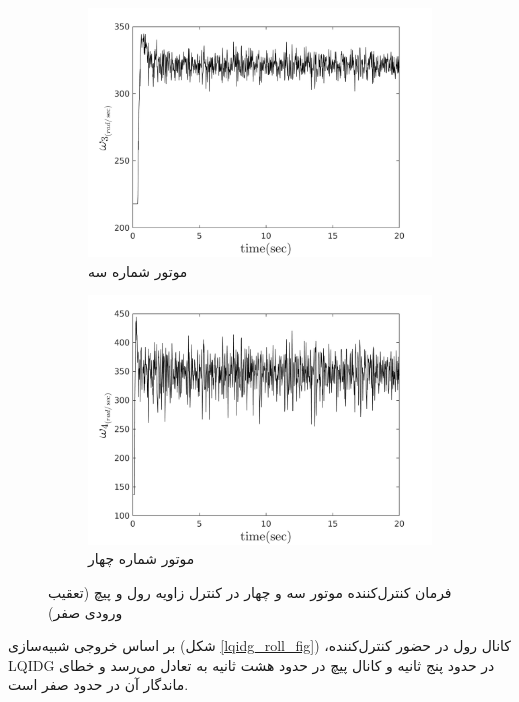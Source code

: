 \begin{figure}[H]
	\centering
	\begin{subfigure}
		\centering
		\includegraphics[width=12cm]{../Figures/MIL/LQIDG/Roll_Pitch/lqidg_roll_pitch_Omega_3.png}
		\caption{موتور شماره سه}
	\end{subfigure}
	\begin{subfigure}
		\centering
		\includegraphics[width=12cm]{../Figures/MIL/LQIDG/Roll_Pitch/lqidg_roll_pitch_Omega_4.png}
		\caption{موتور شماره چهار}
	\end{subfigure}
	\caption{‫‪فرمان کنترل‌کننده موتور سه و چهار در کنترل زاویه رول و پیچ (تعقیب ورودی صفر)}
\end{figure}


بر اساس خروجی شبیه‌سازی (شکل
\ref{lqidg_roll_fig})
،کانال رول در حضور کنترل‌کننده LQIDG در حدود پنج ثانیه و کانال پیچ در حدود هشت ثانیه به تعادل می‌رسد و خطای ماندگار آن در حدود صفر است.